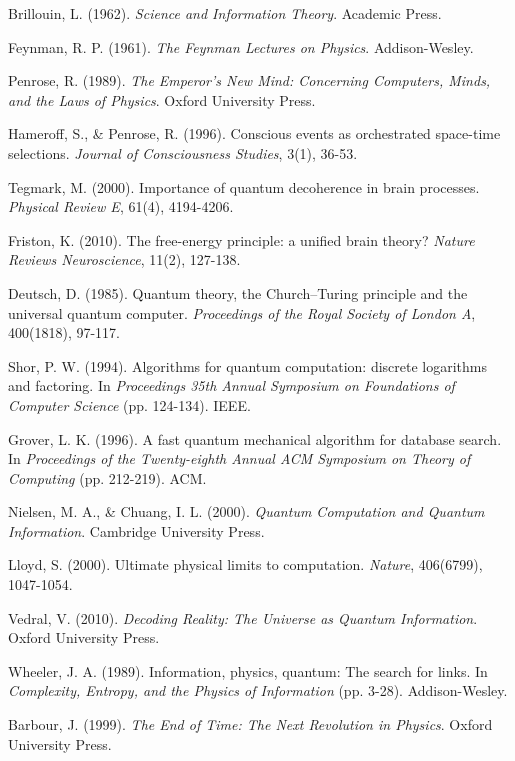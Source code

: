 \documentclass[12pt,a4paper]{article}
\begin{document}
\begin{thebibliography}{99}
Brillouin, L. (1962). \textit{Science and Information Theory}. Academic Press.

Feynman, R. P. (1961). \textit{The Feynman Lectures on Physics}. Addison-Wesley.

Penrose, R. (1989). \textit{The Emperor's New Mind: Concerning Computers, Minds, and the Laws of Physics}. Oxford University Press.

Hameroff, S., \& Penrose, R. (1996). Conscious events as orchestrated space-time selections. \textit{Journal of Consciousness Studies}, 3(1), 36-53.

Tegmark, M. (2000). Importance of quantum decoherence in brain processes. \textit{Physical Review E}, 61(4), 4194-4206.

Friston, K. (2010). The free-energy principle: a unified brain theory? \textit{Nature Reviews Neuroscience}, 11(2), 127-138.

Deutsch, D. (1985). Quantum theory, the Church–Turing principle and the universal quantum computer. \textit{Proceedings of the Royal Society of London A}, 400(1818), 97-117.

Shor, P. W. (1994). Algorithms for quantum computation: discrete logarithms and factoring. In \textit{Proceedings 35th Annual Symposium on Foundations of Computer Science} (pp. 124-134). IEEE.

Grover, L. K. (1996). A fast quantum mechanical algorithm for database search. In \textit{Proceedings of the Twenty-eighth Annual ACM Symposium on Theory of Computing} (pp. 212-219). ACM.

Nielsen, M. A., \& Chuang, I. L. (2000). \textit{Quantum Computation and Quantum Information}. Cambridge University Press.

Lloyd, S. (2000). Ultimate physical limits to computation. \textit{Nature}, 406(6799), 1047-1054.

Vedral, V. (2010). \textit{Decoding Reality: The Universe as Quantum Information}. Oxford University Press.

Wheeler, J. A. (1989). Information, physics, quantum: The search for links. In \textit{Complexity, Entropy, and the Physics of Information} (pp. 3-28). Addison-Wesley.

Barbour, J. (1999). \textit{The End of Time: The Next Revolution in Physics}. Oxford University Press.


\end{thebibliography}
\end{document}
